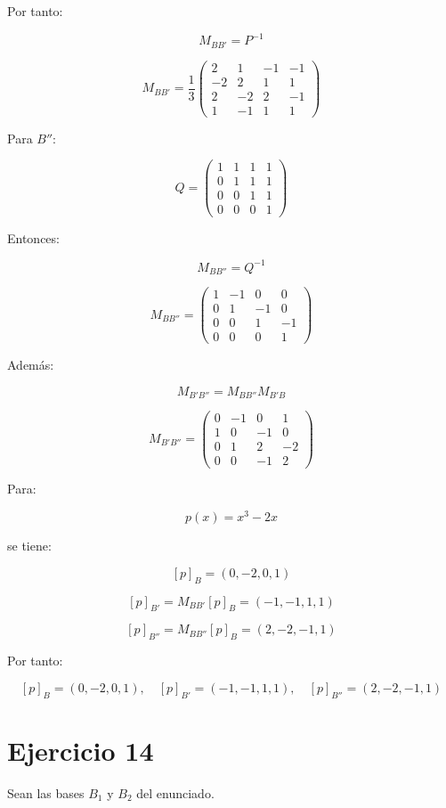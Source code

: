 \documentclass[11pt,a4paper]{article}
\begin{document}
	Por tanto:

	\[
	M_{BB'}
	=
	P^{-1}
	\]

	\[
	\boxed{
	M_{BB'}
	=
	\frac{1}{3}
	\begin{pmatrix}
	2&1&-1&-1\\
	-2&2&1&1\\
	2&-2&2&-1\\
	1&-1&1&1
	\end{pmatrix}
	}
	\]

	Para $B''$:

	\[
	Q=
	\begin{pmatrix}
	1&1&1&1\\
	0&1&1&1\\
	0&0&1&1\\
	0&0&0&1
	\end{pmatrix}
	\]

	Entonces:

	\[
	M_{BB''}
	=
	Q^{-1}
	\]

	\[
	\boxed{
	M_{BB''}
	=
	\begin{pmatrix}
	1&-1&0&0\\
	0&1&-1&0\\
	0&0&1&-1\\
	0&0&0&1
	\end{pmatrix}
	}
	\]

	Además:

	\[
	M_{B'B''}
	=
	M_{BB''}M_{B'B}
	\]

	\[
	\boxed{
	M_{B'B''}
	=
	\begin{pmatrix}
	0&-1&0&1\\
	1&0&-1&0\\
	0&1&2&-2\\
	0&0&-1&2
	\end{pmatrix}
	}
	\]

	Para:

	\[
	p(x)=x^3-2x
	\]

	se tiene:

	\[
	[p]_B=(0,-2,0,1)
	\]

	\[
	[p]_{B'}
	=
	M_{BB'}[p]_B
	=
	(-1,-1,1,1)
	\]

	\[
	[p]_{B''}
	=
	M_{BB''}[p]_B
	=
	(2,-2,-1,1)
	\]

	Por tanto:

	\[
	\boxed{
	[p]_B=(0,-2,0,1),
	\quad
	[p]_{B'}=(-1,-1,1,1),
	\quad
	[p]_{B''}=(2,-2,-1,1)
	}
	\]

\section{Ejercicio 14}
	Sean las bases $B_1$ y $B_2$ del enunciado.
\end{document}

